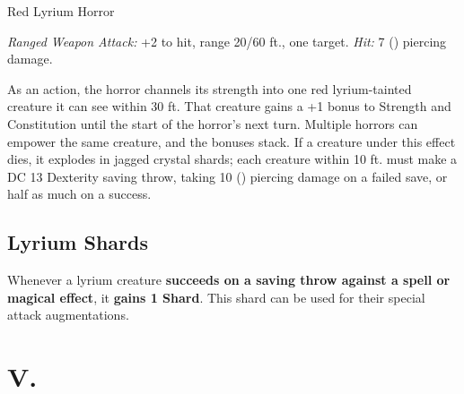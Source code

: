\documentclass{apotheosis-book}
\begin{document}
\begin{monsterbox}{Red Lyrium Horror}
\begin{rpg-monsteraction}
\textit{Ranged Weapon Attack:} +2 to hit, range 20/60 ft., one target. \textit{Hit:} 7 () piercing damage.
\end{rpg-monsteraction}

\begin{rpg-monsteraction}
As an action, the horror channels its strength into one red lyrium-tainted creature it can see within 30 ft. That creature gains a +1 bonus to Strength and Constitution until the start of the horror's next turn. Multiple horrors can empower the same creature, and the bonuses stack. If a creature under this effect dies, it explodes in jagged crystal shards; each creature within 10 ft. must make a DC 13 Dexterity saving throw, taking 10 () piercing damage on a failed save, or half as much on a success.
\end{rpg-monsteraction}

\end{monsterbox}

\newpage

\subsection{Lyrium Shards}

Whenever a lyrium creature \textbf{succeeds on a saving throw against a spell or magical effect},
it \textbf{gains 1 Shard}. This shard can be used for their special attack augmentations.

\newpage

\section{V.}
\end{document}
